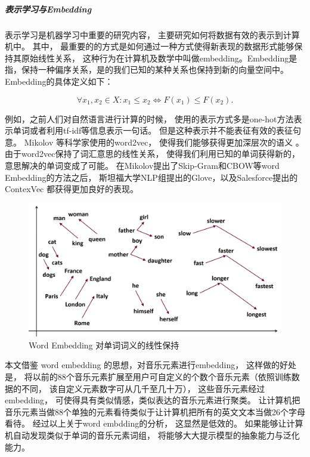 \subparagraph{表示学习与Embedding} 表示学习是机器学习中重要的研究内容， 主要研究如何将数据有效的表示到计算机中。 其中， 最重要的的方式是如何通过一种方式使得新表现的数据形式能够保持其原始线性关系\cite{embedding}， 这种行为在计算机及数学中叫做embedding。Embedding是指，保持一种偏序关系，是的我们已知的某种关系也保持到新的向量空间中。 Embedding的具体定义如下：

$$ \forall x_{1},x_{2}\in X:x_{1}\leq x_{2}\Leftrightarrow F(x_{1})\leq F(x_{2}). $$


例如，之前人们对自然语言进行计算的时候， 使用的表示方式多是one-hot方法表示单词或者利用tf-idf等信息表示一句话。 但是这种表示并不能表征有效的表征句意。 Mikolov 等科学家使用的word2vec， 使得我们能够获得更加深层次的语义 \cite{DBLP:journals/corr/abs-1301-3781}。 由于word2vec保持了词汇意思的线性关系， 使得我们利用已知的单词获得新的，意思解决的单词变成了可能。 在Mikolov提出了Skip-Gram和CBOW等word Embedding的方法之后， 斯坦福大学NLP组提出的Glove，以及Salesforce提出的ContexVec \cite{DBLP:journals/corr/abs-1708-00107} 都获得更加良好的表现。 


\begin{figure}[htbp]
    \centering  %
    \includegraphics[width = .85\linewidth]{data/chapter-2/word2vec2.png} %
    \caption{Word Embedding 对单词词义的线性保持} %
    \label{word2vec} %
\end{figure}

本文借鉴 word embedding 的思想，对音乐元素进行embedding， 这样做的好处是， 将以前的88个音乐元素扩展至用户可自定义的个数个音乐元素（依照训练数据的不同， 该自定义元素数字可从几千至几十万）， 这些音乐元素经过embedding， 可使得具有类似情感，类似表达的音乐元素进行聚类。 让计算机把音乐元素当做88个单独的元素看待类似于让计算机把所有的英文文本当做26个字母看待。 经过以上关于word embdding的分析， 这显然是低效的。 如果能够让计算机自动发现类似于单词的音乐元素词组， 将能够大大提示模型的抽象能力与泛化能力。 


